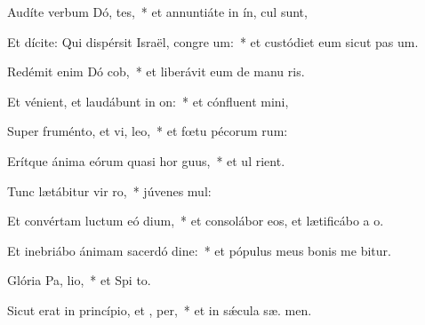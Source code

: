 \item Audíte verbum Dó, tes,~* et annuntiáte in ín,  cul sunt,
\item Et dícite: Qui dispérsit Israël, congre um:~* et custódiet eum sicut pas  um.
\item Redémit enim Dó cob,~* et liberávit eum de manu ris.
\item Et vénient, et laudábunt in  on:~* et cónfluent   mini,
\item Super fruménto, et vi,  leo,~* et fœtu pécorum  rum:
\item Erítque ánima eórum quasi hor guus,~* et ul  rient.
\item Tunc lætábitur vir  ro,~* júvenes   mul:
\item Et convértam luctum eó  dium,~* et consolábor eos, et lætificábo a  o.
\item Et inebriábo ánimam sacerdó dine:~* et pópulus meus bonis me bitur.
\item Glória Pa,  lio,~* et Spi to.
\item Sicut erat in princípio, et ,  per,~* et in sǽcula sæ. men.
